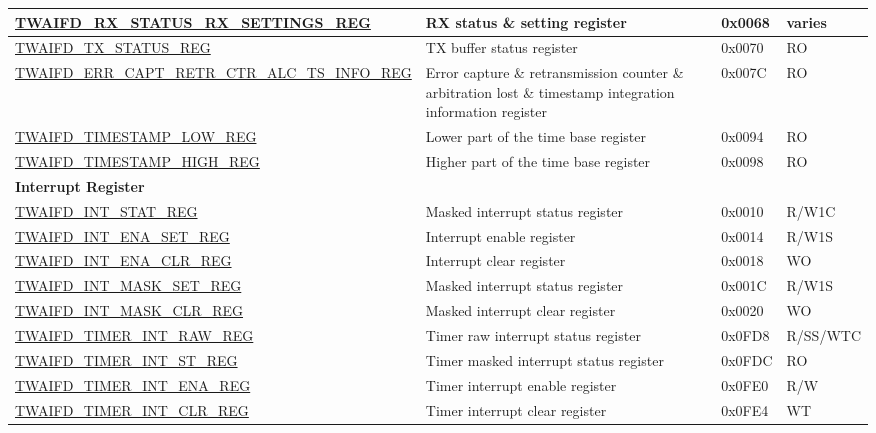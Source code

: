 \begin{longtable}{ | p{6cm} | p{7.2cm} | p{1.3cm} | p{1.5cm} | }
\hyperref[regdesc:TWAIFDRXSTATUSRXSETTINGSREG]{TWAIFD\_RX\_STATUS\_RX\_SETTINGS\newline\_REG} & RX status \& setting register & 0x0068 & varies \\ \hline
\hyperref[regdesc:TWAIFDTXSTATUSREG]{TWAIFD\_TX\_STATUS\_REG} & TX buffer status register & 0x0070 & RO \\ \hline
\hyperref[regdesc:TWAIFDERRCAPTRETRCTRALCTSINFOREG]{TWAIFD\_ERR\_CAPT\_RETR\_CTR\_ALC\newline \_TS\_INFO\_REG} & Error capture \& retransmission counter \& arbitration lost \& timestamp integration information register & 0x007C & RO \\ \hline
\hyperref[regdesc:TWAIFDTIMESTAMPLOWREG]{TWAIFD\_TIMESTAMP\_LOW\_REG} & Lower part of the time base register & 0x0094 & RO \\ \hline
\hyperref[regdesc:TWAIFDTIMESTAMPHIGHREG]{TWAIFD\_TIMESTAMP\_HIGH\_REG} & Higher part of the time base register & 0x0098 & RO \\ \hline
\multicolumn{4}{|l|}{\textbf{Interrupt Register}} \\ \hline
\hyperref[regdesc:TWAIFDINTSTATREG]{TWAIFD\_INT\_STAT\_REG} & Masked interrupt status register & 0x0010 & R/W1C \\ \hline
\hyperref[regdesc:TWAIFDINTENASETREG]{TWAIFD\_INT\_ENA\_SET\_REG} & Interrupt enable register & 0x0014 & R/W1S \\ \hline
\hyperref[regdesc:TWAIFDINTENACLRREG]{TWAIFD\_INT\_ENA\_CLR\_REG} & Interrupt clear register & 0x0018 & WO \\ \hline
\hyperref[regdesc:TWAIFDINTMASKSETREG]{TWAIFD\_INT\_MASK\_SET\_REG} & Masked interrupt status register & 0x001C & R/W1S \\ \hline
\hyperref[regdesc:TWAIFDINTMASKCLRREG]{TWAIFD\_INT\_MASK\_CLR\_REG} & Masked interrupt clear register & 0x0020 & WO \\ \hline
\hyperref[regdesc:TWAIFDTIMERINTRAWREG]{TWAIFD\_TIMER\_INT\_RAW\_REG} & Timer raw interrupt status register & 0x0FD8 & R/SS/WTC \\ \hline
\hyperref[regdesc:TWAIFDTIMERINTSTREG]{TWAIFD\_TIMER\_INT\_ST\_REG} & Timer masked interrupt status register & 0x0FDC & RO \\ \hline
\hyperref[regdesc:TWAIFDTIMERINTENAREG]{TWAIFD\_TIMER\_INT\_ENA\_REG} & Timer interrupt enable register & 0x0FE0 & R/W \\ \hline
\hyperref[regdesc:TWAIFDTIMERINTCLRREG]{TWAIFD\_TIMER\_INT\_CLR\_REG} & Timer interrupt clear register & 0x0FE4 & WT \\ \hline

\end{longtable}
